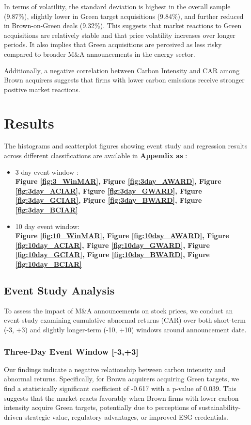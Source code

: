 \documentclass[a4paper]{article}
\begin{document}
In terms of volatility, the standard deviation is highest in the overall sample (9.87\%), slightly lower in Green target acquisitions (9.84\%), and further reduced in Brown-on-Green deals (9.32\%). This suggests that market reactions to Green acquisitions are relatively stable and that price volatility increases over longer periods. It also implies that Green acquisitions are perceived as less risky compared to broader M\&A announcements in the energy sector.

Additionally, a negative correlation between Carbon Intensity and CAR among Brown acquirers suggests that firms with lower carbon emissions receive stronger positive market reactions.

\section{Results}
The histograms and scatterplot figures showing event study and regression results across different classifications are available in \textbf{ Appendix as }:
\begin{itemize}
\item3 day event window : \\
\textbf{Figure \ref{fig:3_WinMAR}, Figure \ref{fig:3day_AWARD}, Figure \ref{fig:3day_ACIAR}, Figure \ref{fig:3day_GWARD}, Figure \ref{fig:3day_GCIAR}, Figure \ref{fig:3day_BWARD}, Figure \ref{fig:3day_BCIAR} }
\item 10 day event window: \\
\textbf{ Figure \ref{fig:10_WinMAR}, Figure \ref{fig:10day_AWARD}, Figure \ref{fig:10day_ACIAR}, Figure \ref{fig:10day_GWARD}, Figure \ref{fig:10day_GCIAR}, Figure \ref{fig:10day_BWARD}, Figure \ref{fig:10day_BCIAR}}
\end{itemize}

\subsection{Event Study Analysis}
To assess the impact of M\&A announcements on stock prices, we conduct an event study examining cumulative abnormal returns (CAR) over both short-term (-3, +3) and slightly longer-term (-10, +10) windows around announcement date.

\subsubsection{Three-Day Event Window [-3,+3]}
Our findings indicate a negative relationship between carbon intensity and abnormal returns. Specifically, for Brown acquirers acquiring Green targets, we find a statistically significant coefficient of -0.617 with a p-value of 0.039. This suggests that the market reacts favorably when Brown firms with lower carbon intensity acquire Green targets, potentially due to perceptions of sustainability-driven strategic value, regulatory advantages, or improved ESG credentials.
\end{document}
